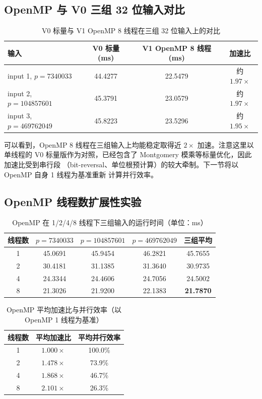 \documentclass[UTF8,a4paper,10pt]{ctexart}
\begin{document}
\subsection{OpenMP 与 V0 三组 32 位输入对比}

\begin{table}[H]
  \centering
  \begin{tabular}{lccc}
  \toprule  
  \textbf{输入} & \textbf{V0 标量} (ms) & \textbf{V1 OpenMP 8 线程} (ms) & \textbf{加速比}\\
  \midrule
  input 1, $p = 7340033$    & 44.4277 & 22.5479 & 约 $1.97\times$ \\
  input 2, $p = 104857601$  & 45.3791 & 23.0579 & 约 $1.97\times$ \\
  input 3, $p = 469762049$  & 45.8223 & 23.5296 & 约 $1.95\times$ \\
  \bottomrule
  \end{tabular}
  \caption{V0 标量与 V1 OpenMP 8 线程在三组 32 位输入上的对比}
  \label{tab:v0vsomp}
\end{table}

可以看到，OpenMP 8 线程在三组输入上均能稳定取得近 $2\times$ 加速。注意这里以单线程的
V0 标量版作为对照，已经包含了 Montgomery 模乘等标量优化，因此加速比受到串行段
（bit-reversal、单位根预计算）的较大牵制。下一节将以 OpenMP 自身 1 线程为基准重新
计算并行效率。

\subsection{OpenMP 线程数扩展性实验}

\begin{table}[H]
  \centering
  \begin{tabular}{ccccc}
  \toprule  
  \textbf{线程数} & $p=7340033$ & $p=104857601$ & $p=469762049$ & \textbf{三组平均}\\
  \midrule
  1 & 45.0691 & 45.9454 & 46.2821 & 45.7655 \\
  2 & 30.4181 & 31.1385 & 31.3640 & 30.9735 \\
  4 & 24.3344 & 24.4606 & 24.7056 & 24.5002 \\
  8 & 21.3026 & 21.9200 & 22.1383 & \textbf{21.7870} \\
  \bottomrule
  \end{tabular}
  \caption{OpenMP 在 1/2/4/8 线程下三组输入的运行时间（单位：ms）}
  \label{tab:omp-scale}
\end{table}

\begin{table}[H]
  \centering
  \begin{tabular}{ccc}
  \toprule  
  \textbf{线程数} & \textbf{平均加速比} & \textbf{平均并行效率}\\
  \midrule
  1 & $1.000\times$ & 100.0\% \\
  2 & $1.478\times$ & 73.9\%  \\
  4 & $1.868\times$ & 46.7\%  \\
  8 & $2.101\times$ & 26.3\%  \\
  \bottomrule
  \end{tabular}
  \caption{OpenMP 平均加速比与并行效率（以 OpenMP 1 线程为基准）}
  \label{tab:omp-speedup}
\end{table}
\end{document}
